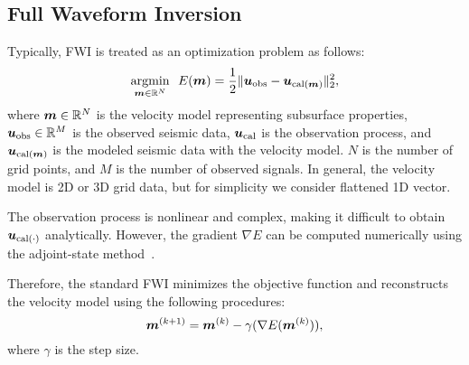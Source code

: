 \subsection{Full Waveform Inversion}\label{subsec:full-waveform-inversion}
Typically, FWI is treated as an optimization problem as follows\cite{FWI0}:
\begin{equation} \label{eq:FWIObjective} \underset{\bm{m} \in \mathbb{R}^N}{\mathrm{argmin}} \ \ E(\bm{m}) = \frac {1} {2} \lVert  \bm{u}_{\mathrm{obs}} - \bm{u}_{\mathrm{cal}(\bm{m})}  \rVert _2^2, \end{equation}
where $\bm{m} \in \mathbb{R}^{N}$ is the velocity model representing subsurface properties, $\bm{u}_{\mathrm{obs}} \in \mathbb{R}^{M}$ is the observed seismic data, $\bm{u}_{\mathrm{cal}}$ is the observation process, and $\bm{u}_{\mathrm{cal}(\bm{m})}$ is the modeled seismic data with the velocity model.
$N$ is the number of grid points, and $M$ is the number of observed signals.
In general, the velocity model is 2D or 3D grid data, but for simplicity we consider flattened 1D vector.

The observation process is nonlinear and complex, making it difficult to obtain $\bm{u}_{\mathrm{cal}(\cdot)}$ analytically.
However, the gradient $\nabla E$ can be computed numerically using the adjoint-state method~\cite{FWI-gradient}.

Therefore, the standard FWI minimizes the objective function and reconstructs the velocity model using the following procedures:
\begin{equation} \label{eq:FWIWithGradient} \bm{m}^{(k+1)} = \bm{m}^{(k)} - \gamma( \nabla E(\bm{m}^{(k)}) ), \end{equation}
where $\gamma$ is the step size.

